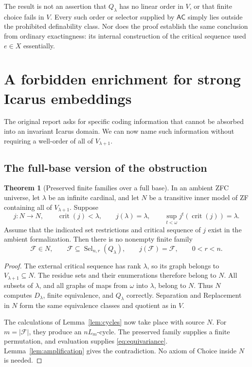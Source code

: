 \documentclass[11pt,letterpaper]{article}
\theoremstyle{definition}
\newtheorem{theorem}[definition]{Theorem}
\newcommand{\AC}{\mathsf{AC}}
\newcommand{\crit}{\operatorname{crit}}
\newcommand{\Sel}{\operatorname{Sel}}
\newcommand{\FF}{\mathscr F}
\begin{document}
The result is not an assertion that $Q_\lambda$ has no linear order in $V$, or that finite choice fails in $V$. Every such order or selector supplied by $\AC$ simply lies outside the prohibited definability class. Nor does the proof establish the same conclusion from ordinary exactingness: its internal construction of the critical sequence used $e\in X$ essentially.

\section{A forbidden enrichment for strong Icarus embeddings}\label{sec:icarus}

The original report asks for specific coding information that cannot be absorbed into an invariant Icarus domain. We can now name such information without requiring a well-order of all of $V_{\lambda+1}$.

\subsection{The full-base version of the obstruction}

\begin{theorem}[Preserved finite families over a full base]\label{thm:fullbase}
In an ambient ZFC universe, let $\lambda$ be an infinite cardinal, and let $N$ be a transitive inner model of ZF containing all of $V_{\lambda+1}$. Suppose
\[
 j:N\to N,
 \qquad \crit(j)<\lambda,
 \qquad j(\lambda)=\lambda,
 \qquad \sup_{t<\omega}j^t(\crit(j))=\lambda.
\]
Assume that the indicated set restrictions and critical sequence of $j$ exist in the ambient formalization. Then there is no nonempty finite family
\[
 \FF\in N,\qquad \FF\subseteq\Sel_{n,r}(Q_\lambda),
 \qquad j(\FF)=\FF,
 \qquad 0<r<n.
\]
\end{theorem}

\begin{proof}
The external critical sequence has rank $\lambda$, so its graph belongs to $V_{\lambda+1}\subseteq N$. The residue sets and their enumerations therefore belong to $N$. All subsets of $\lambda$, and all graphs of maps from $\omega$ into $\lambda$, belong to $N$. Thus $N$ computes $D_\lambda$, finite equivalence, and $Q_\lambda$ correctly. Separation and Replacement in $N$ form the same equivalence classes and quotient as in $V$.

The calculations of Lemma~\ref{lem:cycles} now take place with source $N$. For $m=|\FF|$, they produce an $nL_m$-cycle. The preserved family supplies a finite permutation, and evaluation supplies \eqref{eq:equivariance}. Lemma~\ref{lem:amplification} gives the contradiction. No axiom of Choice inside $N$ is needed.
\end{proof}
\end{document}
